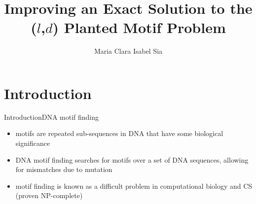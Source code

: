 \documentclass[pdf,xcolor={dvipsnames}]{beamer}
\title{Improving an Exact Solution to the \newline ($l$,$d$) Planted Motif Problem}
\author{Maria Clara Isabel Sia}
\begin{document}
\begin{frame}\titlepage\end{frame}

\section{Introduction}
	\begin{frame}{Introduction}{DNA motif finding}
		\begin{itemize}
			\item {motifs} are repeated sub-sequences in DNA that have some biological significance\newline
			\item {DNA motif finding} searches for motifs over a set of DNA sequences, allowing for mismatches due to mutation\newline
			\item motif finding is known as a difficult problem in computational biology and CS (proven {NP-complete})\newline
		\end{itemize}
		\end{frame}
\end{document}
